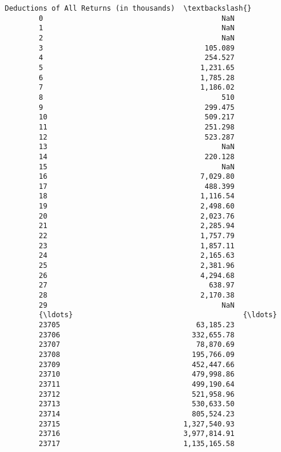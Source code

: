 \documentclass[11pt]{article}
\begin{document}
\begin{Verbatim}[commandchars=\\\{\}]
              Deductions of All Returns (in thousands)  \textbackslash{}
        0                                          NaN   
        1                                          NaN   
        2                                          NaN   
        3                                      105.089   
        4                                      254.527   
        5                                     1,231.65   
        6                                     1,785.28   
        7                                     1,186.02   
        8                                          510   
        9                                      299.475   
        10                                     509.217   
        11                                     251.298   
        12                                     523.287   
        13                                         NaN   
        14                                     220.128   
        15                                         NaN   
        16                                    7,029.80   
        17                                     488.399   
        18                                    1,116.54   
        19                                    2,498.60   
        20                                    2,023.76   
        21                                    2,285.94   
        22                                    1,757.79   
        23                                    1,857.11   
        24                                    2,165.63   
        25                                    2,381.96   
        26                                    4,294.68   
        27                                      638.97   
        28                                    2,170.38   
        29                                         NaN   
        {\ldots}                                        {\ldots}   
        23705                                63,185.23   
        23706                               332,655.78   
        23707                                78,870.69   
        23708                               195,766.09   
        23709                               452,447.66   
        23710                               479,998.86   
        23711                               499,190.64   
        23712                               521,958.96   
        23713                               530,633.50   
        23714                               805,524.23   
        23715                             1,327,540.93   
        23716                             3,977,814.91   
        23717                             1,135,165.58   

\end{Verbatim}
\end{document}
